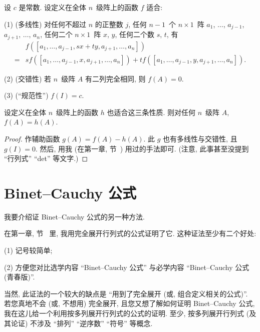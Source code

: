 \begin{theorem}
    设 \(c\) 是常数.
    设定义在全体 \(n\)~级阵上的函数 \(f\) 适合:

    (1)
    (多线性)
    对任何不超过 \(n\) 的正整数 \(j\),
    任何 \(n-1\)~个 \(n \times 1\)~阵
    \(a_1\), \(\dots\), \(a_{j-1}\),
    \(a_{j+1}\), \(\dots\), \(a_n\),
    任何二个 \(n \times 1\)~阵 \(x\), \(y\),
    任何二个数 \(s\), \(t\),
    有
    \begin{align*}
             & f
            {([a_1, \dots, a_{j-1}, sx + ty,
                        a_{j+1}, \dots, a_n])}
        \\
        = {} &
        s
        f {([a_1, \dots, a_{j-1}, x, a_{j+1}, \dots, a_n])}
        +
        t
        f {([a_1, \dots, a_{j-1}, y, a_{j+1}, \dots, a_n])}.
    \end{align*}

    (2)
    (交错性)
    若 \(n\)~级阵 \(A\) 有二列完全相同,
    则 \(f {(A)} = 0\).

    (3)
    (``规范性'')
    \(f(I) = c\).

    设定义在全体 \(n\)~级阵上的函数 \(h\)
    也适合这三条性质.
    则对任何 \(n\)~级阵 \(A\), \(f(A) = h(A)\).
\end{theorem}

\begin{proof}
    作辅助函数 \(g(A) = f(A) - h(A)\).
    此 \(g\) 也有多线性与交错性,
    且 \(g(I) = 0\).
    然后, 用我 (在第一章, 节~) 用过的手法即可.
    (注意, 此事甚至没提到
    ``行列式''
    ``det''
    等文字.)
\end{proof}

\section{Binet--Cauchy 公式}

我要介绍证 Binet--Cauchy 公式的另一种方法.

在第一章, 节~ 里,
我用完全展开行列式的公式证明了它.
这种证法至少有二个好处:

(1)
记号较简单;

(2)
方便您对比选学内容
``Binet--Cauchy 公式''
与必学内容
``Binet--Cauchy 公式 (青春版)''.

当然, 此证法的一个较大的缺点是
``用到了完全展开
(或, 组合定义相关的公式)''.
若您真地不会 (或, 不想用) 完全展开,
且您又想了解如何证明 Binet--Cauchy 公式,
我在这儿给一个利用按多列展开行列式的公式的证明.
至少, 按多列展开行列式 (及其论证) 不涉及
``排列'' ``逆序数'' ``符号''
等概念.

